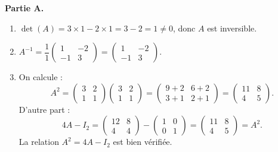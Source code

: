 \documentclass[11pt]{article}
\begin{document}
\begin{corrige}
\textbf{Partie A.}
\begin{enumerate}
\item $\det(A)=3\times1-2\times1=3-2=1\neq0$, donc $A$ est inversible.

\item $A^{-1}=\dfrac{1}{1}\begin{pmatrix} 1 & -2 \\ -1 & 3 \end{pmatrix}=\begin{pmatrix} 1 & -2 \\ -1 & 3 \end{pmatrix}$.

\item On calcule :
\[ A^2=\begin{pmatrix} 3 & 2 \\ 1 & 1 \end{pmatrix}\begin{pmatrix} 3 & 2 \\ 1 & 1 \end{pmatrix}=\begin{pmatrix} 9+2 & 6+2 \\ 3+1 & 2+1 \end{pmatrix}=\begin{pmatrix} 11 & 8 \\ 4 & 5 \end{pmatrix}. \]
D'autre part :
\[ 4A-I_2=\begin{pmatrix} 12 & 8 \\ 4 & 4 \end{pmatrix}-\begin{pmatrix} 1 & 0 \\ 0 & 1 \end{pmatrix}=\begin{pmatrix} 11 & 8 \\ 4 & 5 \end{pmatrix}=A^2. \]
La relation $A^2=4A-I_2$ est bien vérifiée.


\end{enumerate}
\end{corrige}
\end{document}
